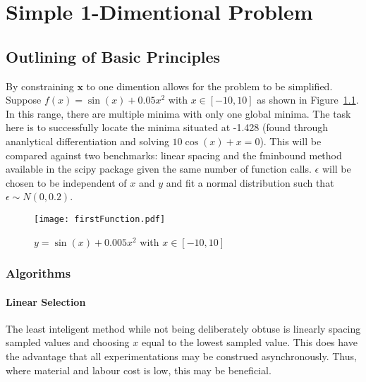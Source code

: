 
\chapter{Simple 1-Dimentional Problem}

\ifpdf
    \graphicspath{{Chapter2/Figs/Raster/}{Chapter2/Figs/PDF/}{Chapter2/Figs/}}
\else
    \graphicspath{{Chapter2/Figs/Vector/}{Chapter2/Figs/}}
\fi


\section{Outlining of Basic Principles}

By constraining $\bm{x}$ to one dimention allows for the problem to be simplified. Suppose ${f(x)=\sin(x)+0.05x^2}$ with ${x\in [-10, 10]}$ as shown in Figure~\ref{fig:firstFunction}. In this range, there are multiple minima with only one global minima. The task here is to successfully locate the minima situated at -1.428 (found through ananlytical differentiation and solving ${10\cos(x)+x=0}$). This will be compared against two benchmarks: linear spacing and the fminbound method available in the scipy package given the same number of function calls. $\epsilon$ will be chosen to be independent of $x$ and $y$ and fit a normal distribution such that ${\epsilon\sim N(0, 0.2)}$.

\begin{figure}[htbp!] 
\centering    
\texttt{[image: firstFunction.pdf]}
\caption[First Function]{$y = \sin(x) + 0.005x^2$ with $x\in [-10, 10]$}
\label{fig:firstFunction}
\end{figure}


\subsection{Algorithms}
\subsubsection{Linear Selection}
The least inteligent method while not being deliberately obtuse is linearly spacing sampled values and choosing $x$ equal to the lowest sampled value. This does have the advantage that all experimentations may be construed asynchronously. Thus, where material and labour cost is low, this may be beneficial.
